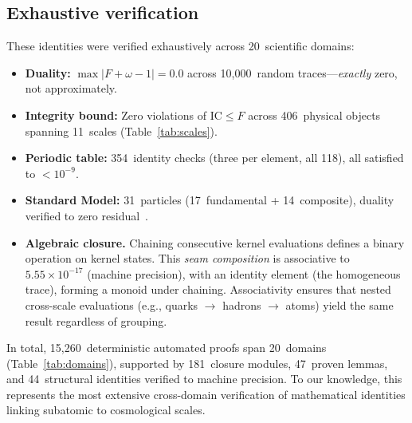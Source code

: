 \documentclass[11pt]{article}
\newcommand{\IC}{\mathrm{IC}}
\begin{document}
\subsection{Exhaustive verification}

These identities were verified exhaustively across
20~scientific domains:

\begin{itemize}[leftmargin=1.5em,itemsep=2pt]
\item \textbf{Duality:} $\max|F + \omega - 1| = 0.0$
  across 10{,}000~random traces---\emph{exactly} zero, not
  approximately.
\item \textbf{Integrity bound:} Zero violations of $\IC \leq F$
  across 406~physical objects spanning 11~scales
  (Table~\ref{tab:scales}).
\item \textbf{Periodic table:} 354~identity checks (three per
  element, all 118), all satisfied to $< 10^{-9}$.
\item \textbf{Standard Model:} 31~particles (17~fundamental +
  14~composite), duality verified to zero
  residual~\cite{pdg2024}.
\item \textbf{Algebraic closure.} Chaining consecutive kernel
  evaluations defines a binary operation on kernel states.
  This \emph{seam composition} is associative to
  $5.55 \times 10^{-17}$ (machine precision), with an identity
  element (the homogeneous trace), forming a
  monoid under chaining. Associativity ensures that nested
  cross-scale evaluations (e.g., quarks $\to$ hadrons $\to$ atoms)
  yield the same result regardless of grouping.
\end{itemize}

In total, 15{,}260~deterministic automated proofs span
20~domains (Table~\ref{tab:domains}), supported by
181~closure modules, 47~proven lemmas, and 44~structural
identities verified to machine precision. To our knowledge,
this represents the most extensive cross-domain verification
of mathematical identities linking subatomic to cosmological
scales.
\end{document}
